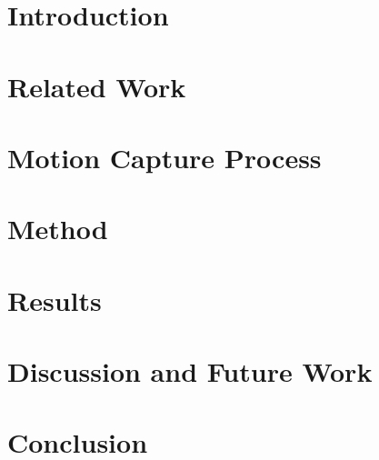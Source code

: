 \documentclass[conference, compsoc, letterpaper]{IEEEtran}
\begin{document}


\maketitle

\IEEEcompsoctitleabstractindextext{
	\begin{abstract}
	\boldmath
	
	\end{abstract}
}

\IEEEdisplaynotcompsoctitleabstractindextext
\IEEEpeerreviewmaketitle

\section{Introduction}


\section{Related Work}


\section{Motion Capture Process}


\section{Method}


\section{Results}


\section{Discussion and Future Work}


\section{Conclusion}


% 

% 

\ifCLASSOPTIONcaptionsoff
  \newpage
\fi



\end{document}
